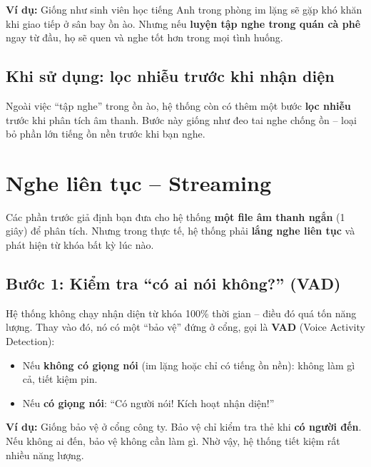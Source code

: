 \documentclass[12pt,a4paper]{article}
\begin{document}
\begin{examplebox}
\textbf{Ví dụ:} Giống như sinh viên học tiếng Anh trong phòng im lặng sẽ gặp
khó khăn khi giao tiếp ở sân bay ồn ào. Nhưng nếu \textbf{luyện tập nghe trong
quán cà phê} ngay từ đầu, họ sẽ quen và nghe tốt hơn trong mọi tình huống.
\end{examplebox}

\subsection{Khi sử dụng: lọc nhiễu trước khi nhận diện}

Ngoài việc ``tập nghe'' trong ồn ào, hệ thống còn có thêm một bước \textbf{lọc nhiễu}
trước khi phân tích âm thanh. Bước này giống như đeo tai nghe chống ồn --
loại bỏ phần lớn tiếng ồn nền trước khi bạn nghe.


\section{Nghe liên tục -- Streaming}

Các phần trước giả định bạn đưa cho hệ thống \textbf{một file âm thanh ngắn}
(1 giây) để phân tích. Nhưng trong thực tế, hệ thống phải \textbf{lắng nghe
liên tục} và phát hiện từ khóa bất kỳ lúc nào.

\subsection{Bước 1: Kiểm tra ``có ai nói không?'' (VAD)}

Hệ thống không chạy nhận diện từ khóa 100\% thời gian -- điều đó quá tốn năng lượng.
Thay vào đó, nó có một ``bảo vệ'' đứng ở cổng, gọi là \textbf{VAD}
(Voice Activity Detection):

\begin{itemize}[leftmargin=1.5cm]
    \item Nếu \textbf{không có giọng nói} (im lặng hoặc chỉ có tiếng ồn nền):
          không làm gì cả, tiết kiệm pin.
    \item Nếu \textbf{có giọng nói}: ``Có người nói! Kích hoạt nhận diện!''
\end{itemize}

\begin{examplebox}
\textbf{Ví dụ:} Giống bảo vệ ở cổng công ty. Bảo vệ chỉ kiểm tra thẻ khi
\textbf{có người đến}. Nếu không ai đến, bảo vệ không cần làm gì. Nhờ vậy,
hệ thống tiết kiệm rất nhiều năng lượng.
\end{examplebox}
\end{document}
